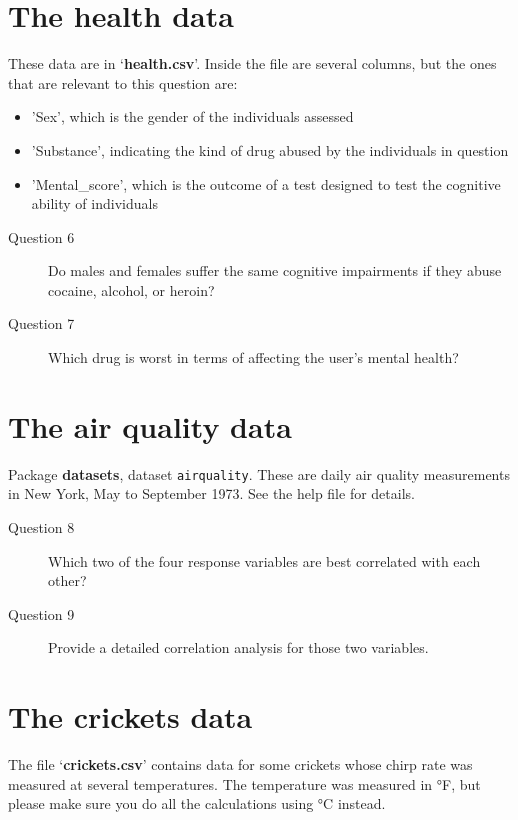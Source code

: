 \documentclass[10pt,a4,]{article}
\begin{document}
\section{The health data}

These data are in `\textbf{health.csv}'. Inside the file are several
columns, but the ones that are relevant to this question are:

\begin{itemize}
\item 'Sex', which is the gender of the individuals assessed
\item 'Substance', indicating the kind of drug abused by the individuals in question
\item 'Mental\_score', which is the outcome of a test designed to test the cognitive ability of individuals
\end{itemize}

\begin{description}
\item[Question 6] Do males and females suffer the same cognitive impairments if they abuse cocaine, alcohol, or heroin?
\item[Question 7] Which drug is worst in terms of affecting the user's mental health?
\end{description}

\section{The air quality data}

Package \textbf{datasets}, dataset \texttt{airquality}. These are daily
air quality measurements in New York, May to September 1973. See the
help file for details.

\begin{description}
\item[Question 8] Which two of the four response variables are best correlated with each other?
\item[Question 9] Provide a detailed correlation analysis for those two variables.
\end{description}

\section{The crickets data}

The file `\textbf{crickets.csv}' contains data for some crickets whose
chirp rate was measured at several temperatures. The temperature was
measured in °F, but please make sure you do all the calculations using
°C instead.
\end{document}
